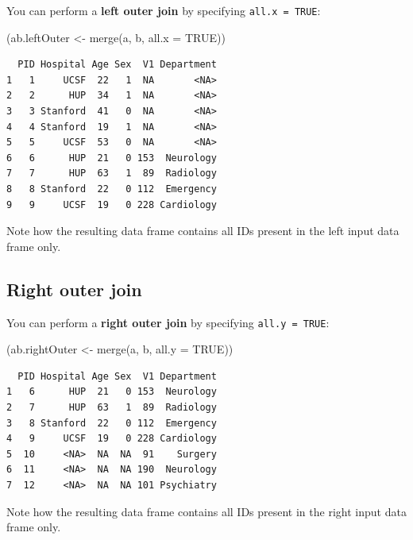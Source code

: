 \documentclass[
]{book}
\newenvironment{Shaded}{\begin{snugshade}}{\end{snugshade}}
\newcommand{\AttributeTok}[1]{\textcolor[rgb]{0.77,0.63,0.00}{#1}}
\newcommand{\ConstantTok}[1]{\textcolor[rgb]{0.00,0.00,0.00}{#1}}
\newcommand{\FunctionTok}[1]{\textcolor[rgb]{0.00,0.00,0.00}{#1}}
\newcommand{\NormalTok}[1]{#1}
\newcommand{\OtherTok}[1]{\textcolor[rgb]{0.56,0.35,0.01}{#1}}
\begin{document}
You can perform a \textbf{left outer join} by specifying \texttt{all.x\ =\ TRUE}:

\begin{Shaded}
\begin{Highlighting}[]
\NormalTok{(ab.leftOuter }\OtherTok{\textless{}{-}} \FunctionTok{merge}\NormalTok{(a, b, }\AttributeTok{all.x =} \ConstantTok{TRUE}\NormalTok{))}
\end{Highlighting}
\end{Shaded}

\begin{verbatim}
  PID Hospital Age Sex  V1 Department
1   1     UCSF  22   1  NA       <NA>
2   2      HUP  34   1  NA       <NA>
3   3 Stanford  41   0  NA       <NA>
4   4 Stanford  19   1  NA       <NA>
5   5     UCSF  53   0  NA       <NA>
6   6      HUP  21   0 153  Neurology
7   7      HUP  63   1  89  Radiology
8   8 Stanford  22   0 112  Emergency
9   9     UCSF  19   0 228 Cardiology
\end{verbatim}

Note how the resulting data frame contains all IDs present in the left input data frame only.

\hypertarget{right-outer-join}{%
\subsection{Right outer join}\label{right-outer-join}}

You can perform a \textbf{right outer join} by specifying \texttt{all.y\ =\ TRUE}:

\begin{Shaded}
\begin{Highlighting}[]
\NormalTok{(ab.rightOuter }\OtherTok{\textless{}{-}} \FunctionTok{merge}\NormalTok{(a, b, }\AttributeTok{all.y =} \ConstantTok{TRUE}\NormalTok{))}
\end{Highlighting}
\end{Shaded}

\begin{verbatim}
  PID Hospital Age Sex  V1 Department
1   6      HUP  21   0 153  Neurology
2   7      HUP  63   1  89  Radiology
3   8 Stanford  22   0 112  Emergency
4   9     UCSF  19   0 228 Cardiology
5  10     <NA>  NA  NA  91    Surgery
6  11     <NA>  NA  NA 190  Neurology
7  12     <NA>  NA  NA 101 Psychiatry
\end{verbatim}

Note how the resulting data frame contains all IDs present in the right input data frame only.
\end{document}
